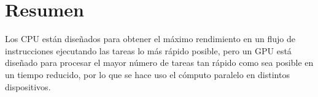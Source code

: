     \section{Resumen}

Los CPU están diseñados para obtener el máximo rendimiento en un flujo de instrucciones ejecutando las tareas lo más rápido posible, pero un GPU está diseñado para procesar el mayor número de tareas tan rápido como sea posible en un tiempo reducido, por lo que se hace uso el cómputo paralelo en distintos dispositivos.



